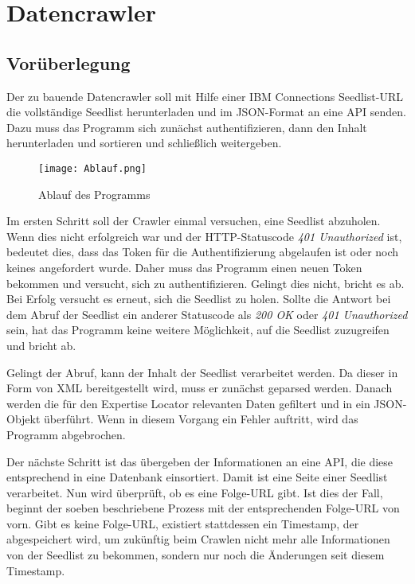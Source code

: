 
\chapter{Datencrawler}

\section{Vorüberlegung}
Der zu bauende Datencrawler soll mit Hilfe einer IBM Connections Seedlist-\ac{URL} die vollständige Seedlist herunterladen und im JSON-Format an eine API senden. Dazu muss das Programm sich zunächst authentifizieren, dann den Inhalt herunterladen und sortieren und schließlich weitergeben.\\
\begin{figure}[ht]
\centering
\texttt{[image: Ablauf.png]}
\caption{Ablauf des Programms}
\end{figure}

Im ersten Schritt soll der Crawler einmal versuchen, eine Seedlist abzuholen. Wenn dies nicht erfolgreich war und der HTTP-Statuscode \textit{401 Unauthorized} ist, bedeutet dies, dass das Token für die Authentifizierung abgelaufen ist oder noch keines angefordert wurde. Daher muss das Programm einen neuen Token bekommen und versucht, sich zu authentifizieren. Gelingt dies nicht, bricht es ab. Bei Erfolg versucht es erneut, sich die Seedlist zu holen. Sollte die Antwort bei dem Abruf der Seedlist ein anderer Statuscode als \textit{200 OK} oder \textit{401 Unauthorized} sein, hat das Programm keine weitere Möglichkeit, auf die Seedlist zuzugreifen und bricht ab.

Gelingt der Abruf, kann der Inhalt der Seedlist verarbeitet werden. Da dieser in Form von XML bereitgestellt wird, muss er zunächst geparsed werden. Danach werden die für den Expertise Locator relevanten Daten gefiltert und in ein JSON-Objekt überführt. Wenn in diesem Vorgang ein Fehler auftritt, wird das Programm abgebrochen.

Der nächste Schritt ist das übergeben der Informationen an eine API, die diese entsprechend in eine Datenbank einsortiert. Damit ist eine Seite einer Seedlist verarbeitet. Nun wird überprüft, ob es eine Folge-\ac{URL} gibt. Ist dies der Fall, beginnt der soeben beschriebene Prozess mit der entsprechenden Folge-URL von vorn. Gibt es keine Folge-\ac{URL}, existiert stattdessen ein Timestamp, der abgespeichert wird, um zukünftig beim Crawlen nicht mehr alle Informationen von der Seedlist zu bekommen, sondern nur noch die Änderungen seit diesem Timestamp.